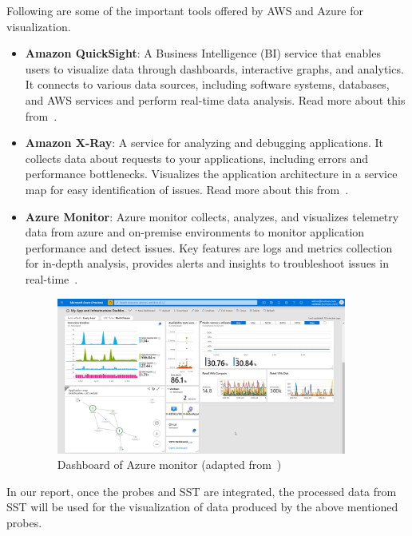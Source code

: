 Following are some of the important tools offered by AWS and Azure for visualization.
\begin{itemize}[label=$\bullet$]
	\item \textbf{Amazon QuickSight}: A Business Intelligence (BI) service that enables users to visualize data through dashboards, interactive graphs, and analytics. It connects to various data sources, including software systems, databases, and AWS services and perform real-time data analysis. Read more about this from~\citep{AWSQuickSight2025}. 
	\item \textbf{Amazon X-Ray}: A service for analyzing and debugging applications. It collects data about requests to your applications, including errors and performance bottlenecks. Visualizes the application architecture in a service map for easy identification of issues. Read more about this from~\citep{AWSXRay2025}.
	\item \textbf{Azure Monitor}: Azure monitor collects, analyzes, and visualizes telemetry data from azure and on-premise environments to monitor application performance and detect issues. Key features are logs and metrics collection for in-depth analysis, provides alerts and insights to troubleshoot issues in real-time~\citep{AzureMonitor2025}.
	
	\begin{figure}[H]
		\centering
		\includegraphics[width=0.9\textwidth]{figures/azure_monitor_dashboard.png}
		\caption[Azure Monitor]{Dashboard of Azure monitor (adapted from~\cite{AzureMonitorBestPractices2025})}
		\label{fig_azure_monitor}
	\end{figure}

\end{itemize}

In our report, once the probes and SST are integrated, the processed data from SST will be used for the visualization of data produced by the above mentioned probes. 